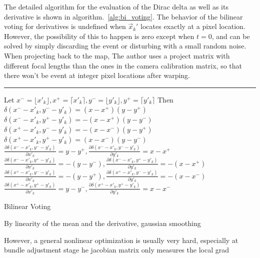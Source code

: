 The detailed algorithm for the evaluation of the Dirac delta as well
as its derivative is shown in algorithm.~\ref{alg:bi_voting}. The
behavior of the bilinear voting for derivatives is undefined when
$\vec{x}_k'$ locates exactly at a pixel location. However, the
possibility of this to happen is zero except when $t=0$, and can be
solved by simply discarding the event or disturbing with a small
random noise. When projecting back to the map, The author uses a
project matrix with different focal lengths than the ones in the
camera calibration matrix, so that there won't be event at integer
pixel locations after warping.
\begin{algorithm}
  \label{alg:bi_voting}
  \DontPrintSemicolon \SetAlgoLined {}
    
  \hrule\; Let\;
  $x^-=\lfloor x'_k\rfloor, x^+=\lceil x'_k\rceil,y^-=\lfloor
  y'_k\rfloor, y^+=\lceil y'_k\rceil$\; Then\;
  $\delta(x^--x'_k,y^--y'_k)=(x-x^+)(y-y^+)$\;
  $\delta(x^--x'_k,y^+-y'_k)=-(x-x^+)(y-y^-)$\;
  $\delta(x^+-x'_k,y^--y'_k)=-(x-x^-)(y-y^+)$\;
  $\delta(x^+-x'_k,y^+-y'_k)=(x-x^-)(y-y^-)$\;
  $\frac{\partial\delta(x^--x'_k,y^--y'_k)}{\partial
    x'_k}=y-y^+,\frac{\partial\delta(x^--x'_k,y^--y'_k)}{\partial
    y'_k}=x-x^+$\;
  $\frac{\partial\delta(x^--x'_k,y^+-y'_k)}{\partial
    x'_k}=-(y-y^-),\frac{\partial\delta(x^--x'_k,y^+-y'_k)}{\partial
    y'_k}=-(x-x^+)$\;
  $\frac{\partial\delta(x^+-x'_k,y^--y'_k)}{\partial
    x'_k}=-(y-y^+),\frac{\partial\delta(x^+-x'_k,y^--y'_k)}{\partial
    y'_k}=-(x-x^-)$\;
  $\frac{\partial\delta(x^+-x'_k,y^+-y'_k)}{\partial
    x'_k}=y-y^-,\frac{\partial\delta(x^+-x'_k,y^+-y'_k)}{\partial
    y'_k}=x-x^-$\;
  \caption{Bilinear Voting}
\end{algorithm}
\BlankLine
By linearity of the mean and the derivative, gaussian smoothing

However, a general nonlinear optimization is usually very hard,
especially at bundle adjustment stage he jacobian matrix only measures
the local grad
